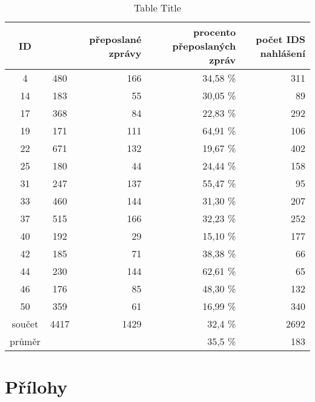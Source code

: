 \documentclass[11pt,final,twoside]{fithesis2}
\begin{document}
\begin {table}[H]
\caption {Table Title} \label{tab:title} 
\begin{center}
\begin{tabular}{ccrrr}
ID  &              & přeposlané \newline zprávy & procento \newline přeposlaných zpráv& počet IDS \newline nahlášení \\
\hline
4   &        480  &        166  &        34,58 \%  &        311 \\
14  &        183  &        55   &        30,05 \%  &        89  \\
17  &        368  &        84   &        22,83 \%  &        292 \\
19  &        171  &        111  &        64,91 \%  &        106 \\
22  &        671  &        132  &        19,67 \%  &        402 \\
25  &        180  &        44   &        24,44 \%  &        158 \\
31  &        247  &        137  &        55,47 \%  &        95 \\
33  &        460  &        144  &        31,30 \%  &        207 \\
37  &        515  &        166  &        32,23 \%  &        252 \\
40  &        192  &        29   &        15,10 \%  &        177 \\
42  &        185  &        71   &        38,38 \%  &        66 \\
44  &        230  &        144  &        62,61 \%  &        65 \\
46  &        176  &        85   &        48,30 \%  &        132 \\
50  &        359  &        61   &        16,99 \%  &        340 \\
\hline
\hline
součet &        4417 &        1429 &        32,4 \%   &        2692 \\
průměr &             &             &        35,5 \%  &        183 \\


\end{tabular}
\end{center}
\end {table}

\appendix

\chapter{Přílohy}
\end{document}
